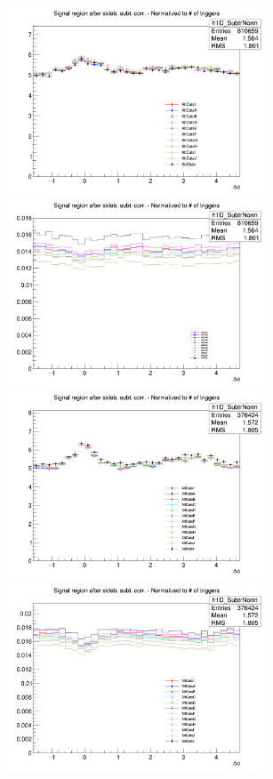 \begin{figure}[!htp]
\centering
{\includegraphics[width=0.47\linewidth, height=5.6cm]{figures/Cut_Optimiz_D0/AzimCorrDistr_Dzero_Canvas_PtIntBins3to5_PoolInt_thr03to99_Superimp.png}}
{\includegraphics[width=0.47\linewidth, height=5.6cm]{figures/Cut_Optimiz_D0/Uncertanty_AzimCorrDistr_Dzero_Canvas_PtIntBins3to5_PoolInt_thr03to99.png}}
{\includegraphics[width=0.47\linewidth, height=5.6cm]{figures/Cut_Optimiz_D0/AzimCorrDistr_Dzero_Canvas_PtIntBins6to8_PoolInt_thr03to99_Superimp.png}}
{\includegraphics[width=0.47\linewidth, height=5.6cm]{figures/Cut_Optimiz_D0/Uncertanty_AzimCorrDistr_Dzero_Canvas_PtIntBins6to8_PoolInt_thr03to99.png}}

\end{figure}
